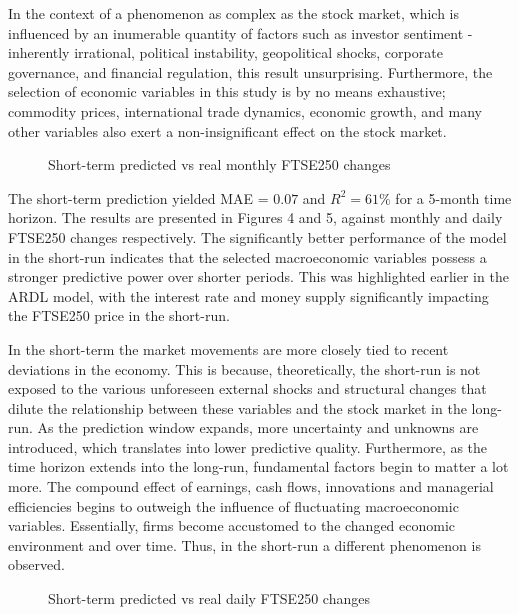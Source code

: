 \documentclass[11pt,a4paper]{article}
\begin{document}
In the context of a phenomenon as complex as the stock market,
which is influenced by an inumerable quantity of factors such as investor sentiment
- inherently irrational, 
political instability, geopolitical shocks, corporate governance, and financial regulation, this result 
unsurprising. Furthermore, the selection of economic variables in this study
is by no means exhaustive; commodity prices, international trade dynamics,
economic growth, and many other variables also exert a non-insignificant 
effect on the stock market.


\begin{figure}[h!]
    \centering
      
    \caption{Short-term predicted vs real monthly FTSE250 changes}
    \label{fig:shortmonthly}
\end{figure}

The short-term prediction yielded MAE = $0.07$ and 
$R^2 = 61\%$ for a 5-month time horizon. The results are presented in Figures 4 
and 5, against monthly and daily FTSE250 changes respectively.
The significantly better performance of the model in the short-run
indicates that the selected macroeconomic variables possess
a stronger predictive power over shorter periods. This was highlighted 
earlier in the ARDL model, with the interest rate and money supply significantly
impacting the FTSE250 price in the short-run. 

In the short-term the market movements
are more closely tied to recent deviations in the economy. This is because,
theoretically, 
the short-run is not exposed to the various unforeseen external shocks and structural changes
that dilute the relationship between these variables and the stock market in the 
long-run. As the prediction window expands, 
more uncertainty and unknowns are introduced, which translates into 
lower predictive quality. Furthermore, as the time horizon extends into the long-run, fundamental factors 
begin to matter a lot more. The compound effect of earnings, cash flows,
innovations and managerial efficiencies begins to outweigh the 
influence of fluctuating macroeconomic variables. Essentially, firms become accustomed 
to the changed economic environment and over time. Thus, in the short-run 
a different phenomenon is observed.


\begin{figure}[h!]
    \centering
      
    \caption{Short-term predicted vs real daily FTSE250 changes}
    \label{fig:shortdaily}
\end{figure}
\end{document}
